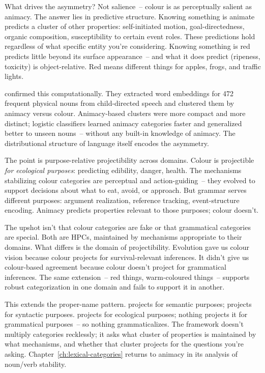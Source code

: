 What drives the asymmetry? Not salience~-- colour is as perceptually salient as animacy. The answer lies in predictive structure. Knowing something is animate predicts a cluster of other properties: self-initiated motion, goal-directedness, organic composition, susceptibility to certain event roles. These predictions hold regardless of what specific entity you're considering. Knowing something is red predicts little beyond its surface appearance~-- and what it does predict (ripeness, toxicity) is object-relative. Red means different things for apples, frogs, and traffic lights.

\textcite{prasertsom2026} confirmed this computationally. They extracted word embeddings for 472 frequent physical nouns from child-directed speech and clustered them by animacy versus colour. Animacy-based clusters were more compact and more distinct; logistic classifiers learned animacy categories faster and generalized better to unseen nouns~-- without any built-in knowledge of animacy. The distributional structure of language itself encodes the asymmetry.

The point is purpose-relative projectibility across domains. Colour is projectible \emph{for ecological purposes}: predicting edibility, danger, health. The mechanisms stabilizing colour categories are perceptual and action-guiding~-- they evolved to support decisions about what to eat, avoid, or approach. But grammar serves different purposes: argument realization, reference tracking, event-structure encoding. Animacy predicts properties relevant to those purposes; colour doesn't.

The upshot isn't that colour categories are fake or that grammatical categories are special. Both are HPCs, maintained by mechanisms appropriate to their domains. What differs is the domain of projectibility. Evolution gave us colour vision because colour projects for survival-relevant inferences. It didn't give us colour-based agreement because colour doesn't project for grammatical inferences. The same extension~-- red things, warm-coloured things~-- supports robust categorization in one domain and fails to support it in another.

This extends the proper-name pattern.  projects for semantic purposes;  projects for syntactic purposes.  projects for ecological purposes; nothing projects it for grammatical purposes~-- so nothing grammaticalizes. The framework doesn't multiply categories recklessly; it asks what cluster of properties is maintained by what mechanisms, and whether that cluster projects for the questions you're asking. Chapter~\ref{ch:lexical-categories} returns to animacy in its analysis of noun/verb stability.


